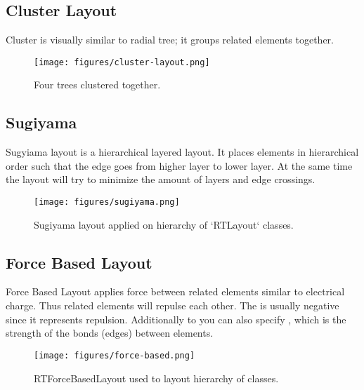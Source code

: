 \documentclass[a4paper,10pt,twoside]{book}
\begin{document}
\subsection{ Cluster Layout}
Cluster is visually similar to radial tree; it groups related elements together.


\begin{figure}

\begin{center}
\texttt{[image: figures/cluster-layout.png]}\caption{Four trees clustered together.\label{cluster-layout}}\end{center}
\end{figure}

\subsection{ Sugiyama}
Sugyiama layout is a hierarchical layered layout. It places elements in hierarchical order such that the edge goes from higher layer to lower layer.
At the same time the layout will try to minimize the amount of layers and edge crossings.


\begin{figure}

\begin{center}
\texttt{[image: figures/sugiyama.png]}\caption{Sugiyama layout applied on hierarchy of `RTLayout` classes.\label{sugiyama}}\end{center}
\end{figure}

\subsection{ Force Based Layout}
Force Based Layout applies force between related elements similar to electrical charge. Thus related elements will repulse each other. The  is usually negative since it represents repulsion.
Additionally to  you can also specify , which is the strength of the bonds (edges) between elements.


\begin{figure}

\begin{center}
\texttt{[image: figures/force-based.png]}\caption{ RTForceBasedLayout used to layout hierarchy of classes.\label{force-based}}\end{center}
\end{figure}
\end{document}
